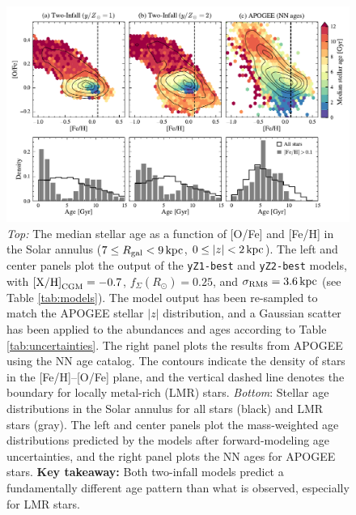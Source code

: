 \documentclass[twocolumn,twocolappendix,linenumbers]{aastex631}
\newcommand{\kpc}{\,{\rm kpc}}
\begin{document}
\begin{figure}
    \centering
    \includegraphics[width=\textwidth]{figures/lmr_ages.pdf}
    \caption{{\it Top:} The median stellar age as a function of [O/Fe] and [Fe/H] in the Solar annulus ($7\leq R_{\rm gal}<9\kpc$, $0\leq|z|<2\kpc$). The left and center panels plot the output of the {\tt yZ1-best} and {\tt yZ2-best} models, with ${\rm [X/H]}_{\rm CGM}=-0.7$, $f_\Sigma(R_\odot)=0.25$, and $\sigma_{\rm RM8}=3.6\kpc$ (see Table \ref{tab:models}). The model output has been re-sampled to match the APOGEE stellar $|z|$ distribution, and a Gaussian scatter has been applied to the abundances and ages according to Table \ref{tab:uncertainties}. The right panel plots the results from APOGEE using the \citet{leung_variational_2023} NN age catalog. The contours indicate the density of stars in the [Fe/H]--[O/Fe] plane, and the vertical dashed line denotes the boundary for locally metal-rich (LMR) stars.
    {\it Bottom}: Stellar age distributions in the Solar annulus for all stars (black) and LMR stars (gray). The left and center panels plot the mass-weighted age distributions predicted by the models after forward-modeling age uncertainties, and the right panel plots the NN ages for APOGEE stars.
    {\bf Key takeaway:} Both two-infall models predict a fundamentally different age pattern than what is observed, especially for LMR stars.}
    \label{fig:lmr-ages}
\end{figure}
\end{document}
